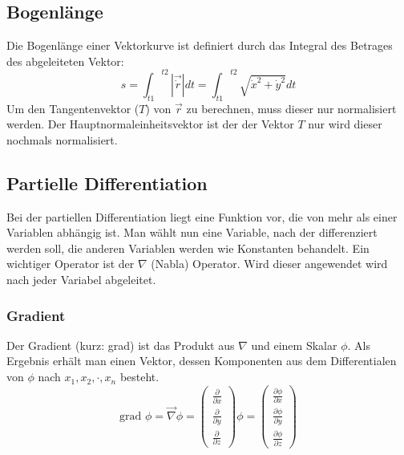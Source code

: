 \documentclass[a4paper,10pt]{scrartcl}
\begin{document}
        \subsection*{Bogenlänge}
        Die Bogenlänge einer Vektorkurve ist definiert durch das Integral des Betrages des abgeleiteten Vektor:
        \begin{equation*}
            s = {\int_{t1}}^{t2} | \vec{\dot{r}} | dt = {\int_{t1}}^{t2}  \sqrt{{\dot{x}}^2 +{\dot{y}}^2} dt 
        \end{equation*} 
        Um den Tangentenvektor (\(T\)) von \(\vec{r}\) zu berechnen, muss dieser nur normalisiert werden. Der Hauptnormaleinheitsvektor ist der der 
        Vektor \(T\) nur wird dieser nochmals normalisiert.
    \subsection{Partielle Differentiation}
        Bei der partiellen Differentiation liegt eine Funktion vor, die von mehr als einer Variablen abhängig ist. Man wählt nun eine Variable, nach der differenziert
        werden soll, die anderen Variablen werden wie Konstanten behandelt. Ein wichtiger Operator ist der \(\nabla\) (Nabla) Operator. Wird dieser angewendet wird nach jeder 
        Variabel abgeleitet.
        \subsubsection{Gradient}
        Der Gradient (kurz: grad) ist das Produkt aus \(\nabla\) und einem Skalar \(\phi\). Als Ergebnis erhält man einen Vektor, dessen Komponenten aus dem Differentialen 
        von \(\phi\) nach \(x_1, x_2,\cdot,x_n\) besteht. 
        \begin{equation*}
            \text{grad } \phi = \vec{\nabla} \phi = \begin{pmatrix} \frac{\partial}{\partial x} \\ \frac{\partial}{\partial y} \\ \frac{\partial}{\partial z} \end{pmatrix} \phi = 
            \begin{pmatrix} \frac{\partial \phi}{\partial x} \\ \frac{\partial \phi}{\partial y} \\ \frac{\partial \phi}{\partial z} \end{pmatrix} 
        \end{equation*}
\end{document}
